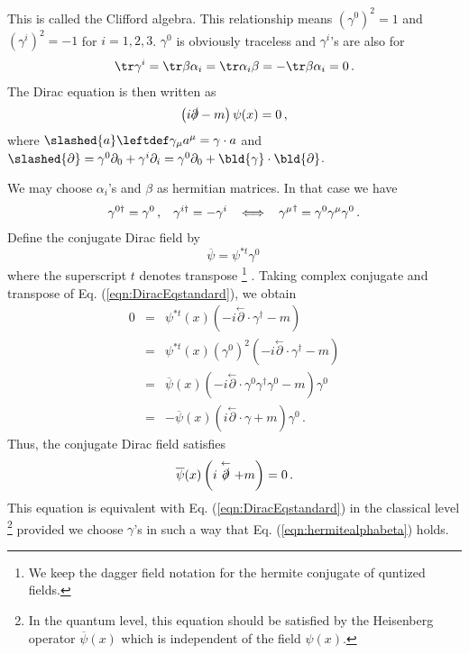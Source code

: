 This is called the Clifford algebra. This relationship means $(\gamma^0)^2 = 1$ and $(\gamma^i)^2 = -1$ for $i = 1,2,3$.
$\gamma^0$ is obviously traceless and $\gamma^i$'s are also for
\begin{eqnarray}
\tr \gamma^i = \tr \beta \alpha_i = \tr \alpha_i \beta = -\tr \beta \alpha_i = 0\,.
\end{eqnarray}
The Dirac equation is then written as
\begin{eqnarray}
\left( i\slashed{\partial} - m \right) \psi(x) = 0\,,
\label{eqn:DiracEqstandard}
\end{eqnarray}
where $\slashed{a} \leftdef \gamma_\mu a^\mu = \gamma \cdot a$ and
$\slashed{\partial} = \gamma^0 \partial_0 + \gamma^i \partial_i = \gamma^0 \partial_0 + \bld{\gamma}\cdot \bld{\partial}$.

We may choose $\alpha_i$'s and $\beta$ as hermitian matrices.
In that case we have
\begin{eqnarray}
\gamma^{0\dagger} = \gamma^0\,,
\hspace{3mm}
\gamma^{i\dagger} = - \gamma^i
\hspace{3mm}
\Longleftrightarrow
\hspace{3mm}
{\gamma^\mu}^\dagger = \gamma^0 \gamma^\mu \gamma^0 \,.
\label{eqn:hermitealphabeta}
\end{eqnarray}
Define the conjugate Dirac field by
\begin{equation}
\overline{\psi} = \psi^{*t} \gamma^0\,
\label{eqn:DefConjDiracField}
\end{equation}
where the superscript $t$ denotes transpose
\footnote{%
We keep the dagger field notation
for the hermite conjugate of quntized fields.
}%
.
Taking complex conjugate and transpose of Eq. (\ref{eqn:DiracEqstandard}), we obtain
\begin{eqnarray}
0 &=&  
\psi^{*t}(x) 
\left( -i \stackrel{\leftarrow}{\partial} \cdot \gamma^\dagger - m \right) 
\nonumber\\
&=&
\psi^{*t}(x) (\gamma^0)^2
\left( -i \stackrel{\leftarrow}{\partial} \cdot \gamma^\dagger - m \right) 
\nonumber\\
&=&
\overline{\psi}(x)
\left( -i \stackrel{\leftarrow}{\partial} \cdot \gamma^0\gamma^\dagger \gamma^0 - m \right) \gamma^0
\nonumber\\
&=&
- \overline{\psi}(x)
\left( i \stackrel{\leftarrow}{\partial} \cdot \gamma  + m \right) \gamma^0 \,.
\nonumber
\end{eqnarray}
Thus, the conjugate Dirac field satisfies
\begin{eqnarray}
\overline{\psi}(x)
\left( i \stackrel{\leftarrow}{\slashed{\partial}}  + m \right)
= 0 \,.
\label{eqn:DiracEqBarstandard}
\end{eqnarray}
This equation is equivalent with Eq. (\ref{eqn:DiracEqstandard}) in the classical level
\footnote{%
In the quantum level, this equation should be satisfied by the Heisenberg operator 
$\overline{\psi}(x)$ which is independent of the field ${\psi}(x)$.
}%
provided we choose $\gamma$'s in such a way that Eq. (\ref{eqn:hermitealphabeta}) holds.

